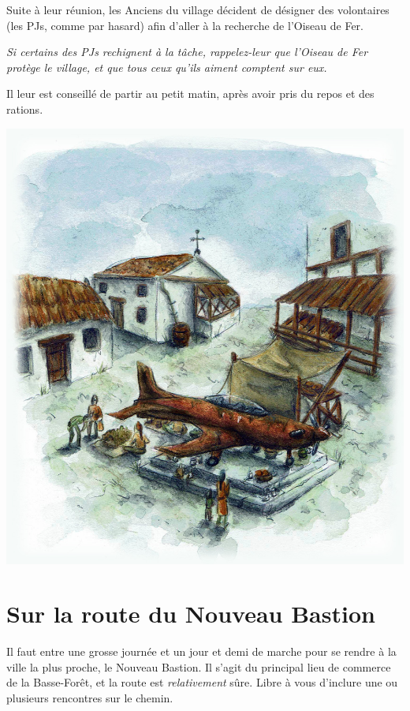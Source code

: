 \documentclass[10pt,twoside,twocolumn,openany,bg=print,justified]{dndbook}
\begin{document}
Suite à leur réunion, les Anciens du village décident de désigner des volontaires (les PJs, comme par hasard) afin d'aller à la recherche de l'Oiseau de Fer. 

\textit{Si certains des PJs rechignent à la tâche, rappelez-leur que l'Oiseau de Fer protège le village, et que tous ceux qu'ils aiment comptent sur eux.}

Il leur est conseillé de partir au petit matin, après avoir pris du repos et des rations.

\onecolumn

\includegraphics[width=\textwidth, keepaspectratio]{img/village.jpg}

\twocolumn

\section{Sur la route du Nouveau Bastion}

Il faut entre une grosse journée et un jour et demi de marche pour se rendre à la ville la plus proche, le Nouveau Bastion. Il s'agit du principal lieu de commerce de la Basse-Forêt, et la route est \textit{relativement} sûre. Libre à vous d'inclure une ou plusieurs rencontres sur le chemin.
\end{document}

